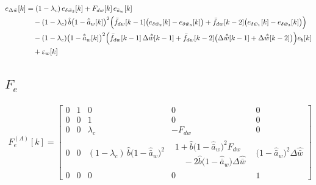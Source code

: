 \documentclass[11pt,a4paper,fontset=none]{ctexart}
\newcommand{\ba}{\bar{a}}
\newcommand{\bw}{\bar{w}}
\newcommand{\dWh}{\Delta\hat{\bw}}
\newcommand{\eD}{e_{\Delta\bw}}
\newcommand{\ah}{\hat{\ba}_w}
\newcommand{\bh}{\hat{b}}
\newcommand{\fd}{\bar f_{dw}}
\newcommand{\ea}{e_{\ba_w}}
\begin{document}
\begin{align*}
\eD[k] &= (1-\lambda_c)\,e_{\delta\bw_3}[k] + F_{dw}[k]\,\ea[k] \\
       &\quad - (1-\lambda_c)\,\bh\bigl(1-\ah[k]\bigr)^{2}\Bigl(\fd[k-1]\bigl(e_{\delta\bw_2}[k] - e_{\delta\bw_3}[k]\bigr)
                 + \fd[k-2]\bigl(e_{\delta\bw_1}[k] - e_{\delta\bw_3}[k]\bigr)\Bigr) \\
       &\quad - (1-\lambda_c)\bigl(1-\ah[k]\bigr)^{2}\Bigl(\fd[k-1]\,\dWh[k-1] + \fd[k-2]\bigl(\dWh[k-1] + \dWh[k-2]\bigr)\Bigr)e_b[k] \\
       &\quad + \varepsilon_w[k]
\end{align*}

\clearpage
\subsection*{$F_e$}

\begin{align*}
F_e^{(A)}[k] = \begin{bmatrix}
0 & 1 & 0 & 0 & 0 \\[2pt]
0 & 0 & 1 & 0 & 0 \\[2pt]
0 & 0 & \lambda_c & -F_{dw} & 0 \\[2pt]
0 & 0 & (1-\lambda_c)\,\bh\bigl(1-\ah\bigr)^{2} &
  \begin{array}{l} 1 + \bh\bigl(1-\ah\bigr)^{2}F_{dw} \\ \quad - 2\bh\bigl(1-\ah\bigr)\dWh \end{array} &
  \bigl(1-\ah\bigr)^{2}\dWh \\[10pt]
0 & 0 & 0 & 0 & 1
\end{bmatrix}
\end{align*}
\end{document}
